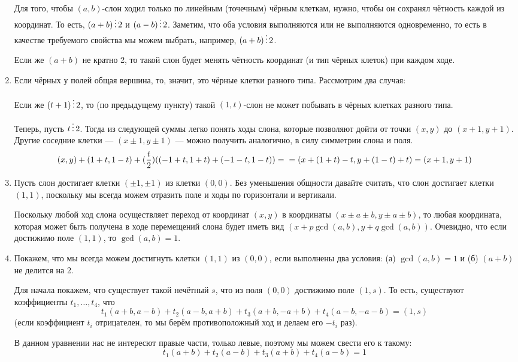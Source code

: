 \begin{enumerate}
Для того, чтобы $(a,b)$-слон ходил только по линейным (точечным)
чёрным клеткам, нужно, чтобы он сохранял чётность каждой из координат.
То есть, $(a+b) \mathop{\vdots} 2$ и $(a-b) \mathop{\vdots} 2$. Заметим, что оба условия
выполняются или не выполняются одновременно, то есть в качестве требуемого
свойства мы можем выбрать, например, $(a+b) \mathop{\vdots} 2$.

Если же $(a+b)$ не кратно 2, то такой слон будет менять чётность координат
(и тип чёрных клеток) при каждом ходе.

\item Если чёрных у полей общая вершина, то, значит, это чёрные клетки разного
типа. Рассмотрим два случая:

Если же $(t+1) \mathop{\vdots} 2$, то (по предыдущему пункту) такой $(1,t)$-слон 
не может побывать в чёрных клетках разного типа. 

Теперь, пусть $t \mathop{\vdots} 2$. Тогда из следующей суммы легко понять ходы слона,
которые позволяют дойти от точки $(x,y)$ до $(x+1,y+1)$. Другие соседние клетки ---
$(x \pm 1, y \pm 1)$ --- можно получить аналогично, в силу симметрии слона и 
поля.
$$(x,y) + (1+t,1-t) + (\frac{t}{2}) ((-1+t,1+t) + (-1-t,1-t)) = \\
= (x+(1+t)-t, y+(1-t)+t) = (x+1,y+1)$$

\item Пусть слон достигает клетки $(\pm 1,\pm 1)$ из клетки $(0,0)$.
Без уменьшения общности давайте считать, что слон достигает клетки $(1,1)$, 
поскольку мы всегда можем отразить поле и ходы по горизонтали и вертикали.

Поскольку любой ход
слона осуществляет переход от координат $(x,y)$ в координаты 
$(x \pm a \pm b, y \pm a \pm b)$, то любая координата, которая может быть получена
в ходе перемещений слона будет иметь вид $(x + p\gcd(a,b), y + q\gcd(a,b))$.
Очевидно, что если достижимо поле $(1,1)$, то $\gcd(a,b) = 1$.

\item Покажем, что мы всегда можем достигнуть клетки $(1,1)$ из $(0,0)$,
если выполнены два условия: (а) $\gcd(a,b)=1$ и (б) $(a+b)$ не делится на 2.

Для начала покажем, что существует такой нечётный $s$, что из поля $(0,0)$ 
достижимо поле $(1,s)$.
То есть, существуют коэффициенты $t_1, \ldots, t_4$, что 
$$t_1 (a+b,a-b) + t_2 (a-b,a+b) + t_3 (a+b,-a+b) + t_4 (a-b,-a-b) = (1,s)$$
(если коэффициент $t_i$ отрицателен, то мы берём противоположный ход и делаем
его $-t_i$ раз).

В данном уравнении нас не интересют правые части, только левые, поэтому мы
можем свести его к такому:
$$t_1 (a+b) + t_2 (a-b) + t_3 (a+b) + t_4 (a-b) = 1$$


\end{enumerate}
